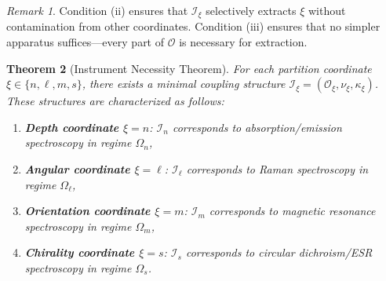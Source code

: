 \documentclass[twocolumn,10pt,a4paper]{article}
\newtheorem{theorem}{Theorem}[section]
\theoremstyle{remark}
\newtheorem{remark}[theorem]{Remark}
\newcommand{\oscillator}{\mathcal{O}}
\begin{document}
\begin{remark}
Condition (ii) ensures that $\mathcal{I}_\xi$ selectively extracts $\xi$ without contamination from other coordinates. Condition (iii) ensures that no simpler apparatus suffices—every part of $\oscillator$ is necessary for extraction.
\end{remark}

\begin{theorem}[Instrument Necessity Theorem]
\label{thm:instrument_necessity}
For each partition coordinate $\xi \in \{n, \ell, m, s\}$, there exists a minimal coupling structure $\mathcal{I}_\xi = (\oscillator_\xi, \nu_\xi, \kappa_\xi)$. These structures are characterized as follows:
\begin{enumerate}[label=(\alph*)]
    \item \textbf{Depth coordinate $\xi = n$}: $\mathcal{I}_n$ corresponds to absorption/emission spectroscopy in regime $\Omega_n$,
    \item \textbf{Angular coordinate $\xi = \ell$}: $\mathcal{I}_\ell$ corresponds to Raman spectroscopy in regime $\Omega_\ell$,
    \item \textbf{Orientation coordinate $\xi = m$}: $\mathcal{I}_m$ corresponds to magnetic resonance spectroscopy in regime $\Omega_m$,
    \item \textbf{Chirality coordinate $\xi = s$}: $\mathcal{I}_s$ corresponds to circular dichroism/ESR spectroscopy in regime $\Omega_s$.
\end{enumerate}
\end{theorem}
\end{document}
